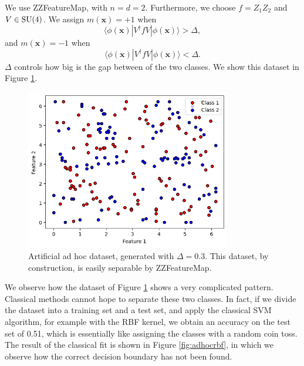 \documentclass[12pt]{article}
\begin{document}
We use ZZFeatureMap, with $n=d=2$. Furthermore, we choose $f=Z_1Z_2$ and $V\in\textup{SU}(4)$. We assign $m(\mathbf{x})=+1$ when 
\begin{equation}
    \langle \phi(\mathbf{x}) |V^\dagger f V|\phi(\mathbf{x})\rangle >\Delta,
\end{equation} 
and $m(\mathbf{x})=-1$ when 
\begin{equation}
    \langle \phi(\mathbf{x}) |V^\dagger f V|\phi(\mathbf{x})\rangle <\Delta.
\end{equation} 
$\Delta$ controls how big is the gap between of the two classes. We show this dataset in Figure \ref{fig:adhoc}.
\begin{figure}[h!]
    \centering
    \includegraphics[width=0.8\textwidth]{images/adhoc.png}
    \caption{Artificial ad hoc dataset, generated with $\Delta=0.3$. This dataset, by construction, is easily separable by ZZFeatureMap.}
    \label{fig:adhoc}
\end{figure}
We observe how the dataset of Figure \ref{fig:adhoc} shows a very complicated pattern. Classical methods cannot hope to separate these two classes. In fact, if we divide the dataset into a training set and a test set, and apply the classical SVM algorithm, for example with the RBF kernel, we obtain an accuracy on the test set of 0.51, which is essentially like assigning the classes with a random coin toss. The result of the classical fit is shown in Figure \ref{fig:adhocrbf}, in which we observe how the correct decision boundary has not been found. 
\end{document}
